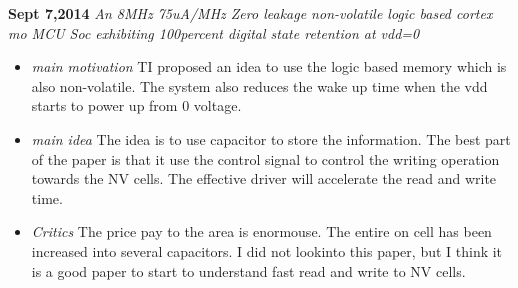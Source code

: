 \documentclass[]{article}
\begin{document}
\noindent \textbf{Sept 7,2014}
\textit{An 8MHz 75uA/MHz Zero leakage non-volatile logic based cortex mo MCU Soc exhibiting 100percent digital state retention at vdd=0}
\indent		\begin{itemize}
            \item \textit{main motivation} 
                TI proposed an idea to use the logic based memory which is also non-volatile.
                The system also reduces the wake up time when the vdd starts to power up from 0 voltage.
               
            \item \textit{main idea} 
                The idea is to use capacitor to store the information.
                The best part of the paper is that it use the control signal to control the writing operation towards the NV cells.
                The effective driver will accelerate the read and write time.
                
            \item \textit{Critics}
                The price pay to the area is enormouse. 
                The entire on cell has been increased into several capacitors.
                I did not lookinto this paper, but I think it is a good paper to start to understand fast read and write to NV cells. 
        \end{itemize}
\end{document}
